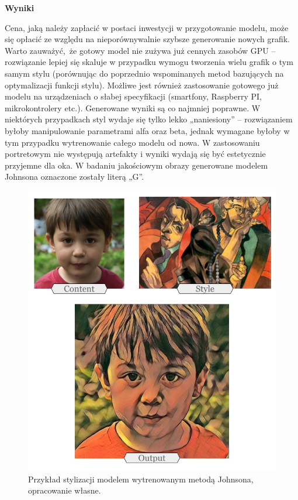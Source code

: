 \documentclass[12pt]{article}
\begin{document}
\noindent\textbf{Wyniki}

Cena, jaką należy zapłacić w postaci inwestycji w przygotowanie modelu, może się opłacić ze względu na nieporównywalnie szybsze generowanie nowych grafik. Warto zauważyć, że gotowy model nie zużywa już cennych zasobów GPU – rozwiązanie lepiej się skaluje w przypadku wymogu tworzenia wielu grafik o tym samym stylu (porównując do poprzednio wspominanych metod bazujących na optymalizacji funkcji stylu). Możliwe jest również zastosowanie gotowego już modelu na urządzeniach o słabej specyfikacji (smartfony, Raspberry PI, mikrokontrolery etc.). Generowane wyniki są co najmniej poprawne. W niektórych przypadkach styl wydaje się tylko lekko „naniesiony” – rozwiązaniem byłoby manipulowanie parametrami alfa oraz beta, jednak wymagane byłoby w tym przypadku wytrenowanie całego modelu od nowa. W zastosowaniu portretowym nie występują artefakty i wyniki wydają się być estetycznie przyjemne dla oka. W badaniu jakościowym obrazy generowane modelem Johnsona oznaczone zostały literą „G”.

\begin{figure}[H]
    \centering
    \includegraphics[scale=0.42]{u22.png}
    \caption{Przykład stylizacji modelem wytrenowanym metodą Johnsona, opracowanie własne.}
    \label{fig:15:1}
\end{figure}
\end{document}
